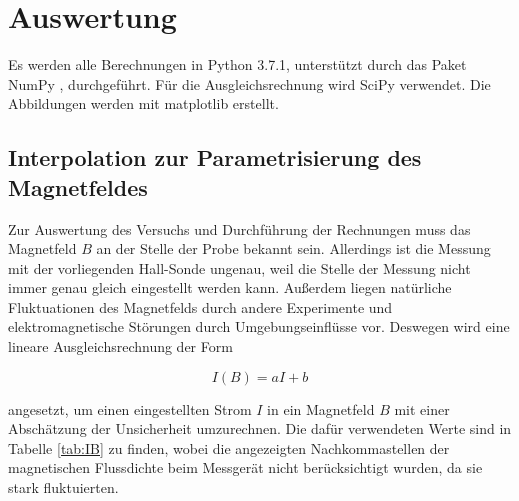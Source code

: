\section{Auswertung}
\label{sec:Auswertung}

Es werden alle Berechnungen in Python 3.7.1, unterstützt durch das
Paket NumPy \cite{numpy}, durchgeführt. Für die Ausgleichsrechnung wird SciPy
\cite{scipy} verwendet. Die Abbildungen werden mit matplotlib \cite{matplotlib} erstellt.

\subsection{Interpolation zur Parametrisierung des Magnetfeldes}

Zur Auswertung des Versuchs und Durchführung der Rechnungen muss das Magnetfeld $B$
an der Stelle der Probe bekannt sein. Allerdings ist die Messung mit der vorliegenden Hall-Sonde
ungenau, weil die Stelle der Messung nicht immer genau gleich eingestellt werden kann.
Außerdem liegen natürliche Fluktuationen des Magnetfelds durch andere Experimente und elektromagnetische
Störungen durch Umgebungseinflüsse vor. Deswegen wird eine lineare Ausgleichsrechnung der Form

\begin{equation*}
  I(B) = aI+b
\end{equation*}

angesetzt, um einen eingestellten Strom $I$ in ein Magnetfeld $B$ mit einer Abschätzung der Unsicherheit umzurechnen.
Die dafür verwendeten Werte sind in Tabelle \ref{tab:IB} zu finden, wobei die angezeigten Nachkommastellen der magnetischen Flussdichte beim Messgerät nicht berücksichtigt wurden, da sie stark fluktuierten.

